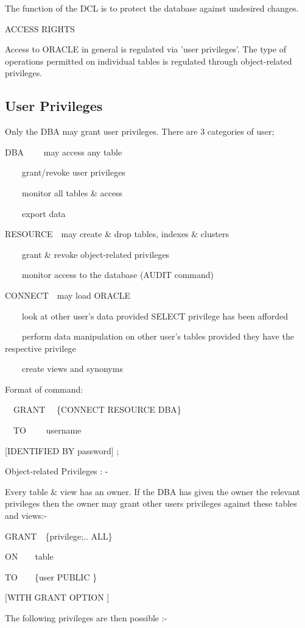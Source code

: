 The function of the DCL is to protect the database against undesired changes.

ACCESS RIGHTS

Access to ORACLE in general is regulated via 'user privileges'.  The type of operations permitted on individual tables is regulated through object-related privileges.

\subsection{User Privileges}
Only the DBA may grant user privileges. There are 3 categories of user;

DBA  \ \ \ \ may access any table

\ \ \ \ grant/revoke user privileges

\ \ \ \ monitor all tables \& access

\ \ \ \ export data

RESOURCE\ \ may create \& drop tables, indexes \& clusters

\ \ \ \ grant \& revoke object-related privileges

\ \ \ \ monitor access to the database (AUDIT command)

CONNECT\ \ may load ORACLE

\ \ \ \ look at other user's data provided SELECT privilege has been afforded 

\ \ \ \ perform data manipulation on other user's tables provided they have the respective privilege

\ \ \ \ create views and synonyms

Format of command:

 \ \ GRANT \ \ \{CONNECT RESOURCE {\textbar} DBA\}

 \ \ TO \ \ \ \ username

[IDENTIFIED BY password] ;

Object-related Privileges : -

Every table \& view has an owner.  If the DBA has given the owner the relevant privileges then the owner may grant other users privileges against these tables and views:-

GRANT\ \ \{privilege;.. {\textbar} ALL\}

ON\ \ \ \  table

TO\ \ \ \ \{user {\textbar} PUBLIC \}

[WITH GRANT OPTION ]

The following privileges are then possible :-

